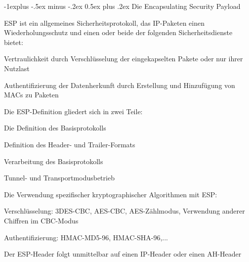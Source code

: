 \documentclass[a4paper]{article}
\makeatletter
\renewcommand{\subsection}{\@startsection{subsection}{2}{0mm}%
 {-1explus -.5ex minus -.2ex}%
 {0.5ex plus .2ex}%
 {\normalfont\normalsize\bfseries}}
\makeatother
\begin{document}
\begin{multicols}{3}
      \subsection{Die Encapsulating Security Payload}
      \begin{itemize*}
            \item ESP ist ein allgemeines Sicherheitsprotokoll, das IP-Paketen einen Wiederholungsschutz und einen oder beide der folgenden Sicherheitsdienste bietet:
            \begin{itemize*}
                  \item Vertraulichkeit durch Verschlüsselung der eingekapselten Pakete oder nur ihrer Nutzlast
                  \item Authentifizierung der Datenherkunft durch Erstellung und Hinzufügung von MACs zu Paketen
            \end{itemize*}
            \item Die ESP-Definition gliedert sich in zwei Teile:
            \begin{itemize*}
                  \item Die Definition des Basisprotokolls
                  \begin{itemize*}
                        \item Definition des Header- und Trailer-Formats
                        \item Verarbeitung des Basisprotokolls
                        \item Tunnel- und Transportmodusbetrieb
                  \end{itemize*}
                  \item Die Verwendung spezifischer kryptographischer Algorithmen mit ESP:
                  \begin{itemize*}
                        \item Verschlüsselung: 3DES-CBC, AES-CBC, AES-Zählmodus, Verwendung anderer Chiffren im CBC-Modus
                        \item Authentifizierung: HMAC-MD5-96, HMAC-SHA-96,...
                  \end{itemize*}
            \end{itemize*}
            \begin{itemize*}
                  \item Der ESP-Header folgt unmittelbar auf einen IP-Header oder einen AH-Header

\end{itemize*}
\end{itemize*}
\end{multicols}
\end{document}
